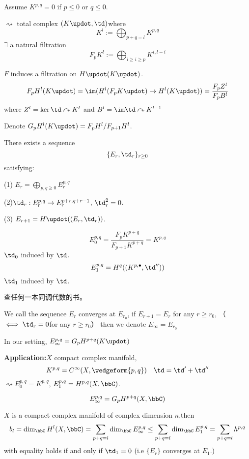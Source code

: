 Assume $K^{p,q}=0$ if $p\leq 0$ or $q\leq 0$.

$\rightsquigarrow$ total complex $(K\updot,\td)$where 
$$K^l:=\bigoplus_{p+q=l}K^{p,q}$$
$\exists$ a natural filtration 
$$F_pK^l:=\bigoplus_{l\geq i\geq p}K^{i,l-i}$$

$F$ induces a filtration on $H\updot(K\updot)$.
$$F_pH^l(K\updot)=\im(H^l(F_pK\updot)\to H^l(K\updot))
=\frac{F_p Z^l}{F_p B^l}$$
where $Z^l=\ker \td\curvearrowright K^l$ and $B^l=\im\td\curvearrowright K^{l-1}$

Denote $G_pH^l(K\updot)=F_pH^l/F_{p+1}H^l$.

\begin{thm}There exists a sequence
$$\{E_r,\td_r\}_{r\geq 0}$$
satisfying:

(1) $E_r=\bigoplus\limits_{p,q\geq 0}E_r^{p,q}$

(2)$\td_r:E_r^{p,q}\to E_r^{p+r,q+r-1}$, $\td_r^2=0$.

(3) $E_{r+1}=H\updot((E_r,\td_r))$.

\end{thm}

$$E_0^{p,q}=\frac{F_p K^{p+q}}{F_{p+1}K^{p+q}}=K^{p,q}$$
$\td_0$ induced by $\td$.
$$E_1^{p,q}=H^q((K^{p,\bullet},\td''))$$
$\td_1$ induced by $\td$.

查任何一本同调代数的书。

\begin{definition}
We call the sequence ${E_r}$ converges at $E_{r_0}$,
if $E_{r+1}=E_r$ for any $r\geq r_0$,
（$\iff\td_r=0$for any $r\geq r_0$）
then we denote $E_\infty=E_{r_0}$ 
\end{definition}

In our setting, $E_\infty^{p,q}=G_pH^{p+q}(K\updot)$

\textbf{Application:}$X$ compact complex manifold,
$$K^{p,q}=C^\infty(X,\wedgeform{p,q})\quad \td=\td'+\td''$$
$\rightsquigarrow E_0^{p,q}=K^{p,q}$,
$E_1^{p,q}=H^{p,q}(X,\bbC)$.

\begin{cor}
$$E^{p,q}_\infty=G_pH^{p+q}(X,\bbC)$$
\end{cor}

\begin{thm}
$X$ is a compact complex manifold of complex dimension $n$,then
$$b_l=\dim_{\bbC}H^l(X,\bbC)=\sum_{p+q=l}\dim_{\bbC}E_\infty^{p,q}\leq
\sum_{p+q=l}\dim_{\bbC}E_1^{p,q}=\sum_{p+q=l}h^{p,q}$$
with equality holds if and only if $\td_1=0$
(i.e $\{E_r\}$ converges at $E_1$.)
\end{thm}

